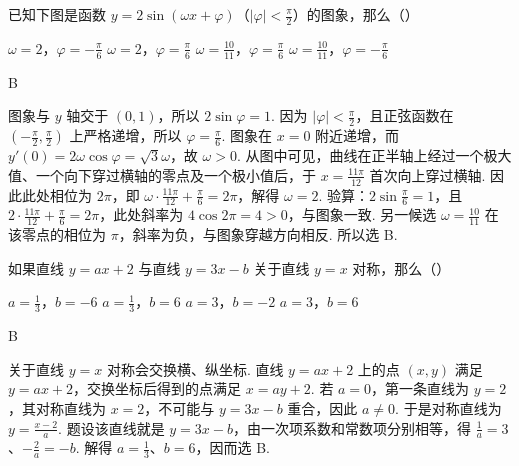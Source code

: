 \begin{problem}
已知下图是函数 \(y=2\sin\left( \omega x+\varphi \right)\)（\(\left| \varphi \right|<\frac{\pi}{2}\)）的图象，那么（\quad）


\choices
    {\(\omega=2\)，\(\varphi=-\frac{\pi}{6}\)}
    {\(\omega=2\)，\(\varphi=\frac{\pi}{6}\)}
    {\(\omega=\frac{10}{11}\)，\(\varphi=\frac{\pi}{6}\)}
    {\(\omega=\frac{10}{11}\)，\(\varphi=-\frac{\pi}{6}\)}
\end{problem}

\begin{answer}
B
\end{answer}

\begin{solution}
图象与 \(y\) 轴交于 \(\left(0,1\right)\)，所以 \(2\sin\varphi=1\). 因为 \(\left|\varphi\right|<\frac{\pi}{2}\)，且正弦函数在 \(\left(-\frac{\pi}{2},\frac{\pi}{2}\right)\) 上严格递增，所以 \(\varphi=\frac{\pi}{6}\). 图象在 \(x=0\) 附近递增，而 \(y'(0)=2\omega\cos\varphi=\sqrt{3}\omega\)，故 \(\omega>0\). 从图中可见，曲线在正半轴上经过一个极大值、一个向下穿过横轴的零点及一个极小值后，于 \(x=\frac{11\pi}{12}\) 首次向上穿过横轴. 因此此处相位为 \(2\pi\)，即 \(\omega\cdot\frac{11\pi}{12}+\frac{\pi}{6}=2\pi\)，解得 \(\omega=2\). 验算：\(2\sin\frac{\pi}{6}=1\)，且 \(2\cdot\frac{11\pi}{12}+\frac{\pi}{6}=2\pi\)，此处斜率为 \(4\cos2\pi=4>0\)，与图象一致. 另一候选 \(\omega=\frac{10}{11}\) 在该零点的相位为 \(\pi\)，斜率为负，与图象穿越方向相反. 所以选 B.
\end{solution}

\begin{problem}
如果直线 \(y=ax+2\) 与直线 \(y=3x-b\) 关于直线 \(y=x\) 对称，那么（\quad）

\choices
    {\(a=\frac{1}{3}\)，\(b=-6\)}
    {\(a=\frac{1}{3}\)，\(b=6\)}
    {\(a=3\)，\(b=-2\)}
    {\(a=3\)，\(b=6\)}
\end{problem}

\begin{answer}
B
\end{answer}

\begin{solution}
关于直线 \(y=x\) 对称会交换横、纵坐标. 直线 \(y=ax+2\) 上的点 \((x,y)\) 满足 \(y=ax+2\)，交换坐标后得到的点满足
\(x=ay+2\).
若 \(a=0\)，第一条直线为 \(y=2\)，其对称直线为 \(x=2\)，不可能与 \(y=3x-b\) 重合，因此 \(a\ne0\). 于是对称直线为 \(y=\frac{x-2}{a}\). 题设该直线就是 \(y=3x-b\)，由一次项系数和常数项分别相等，得 \(\frac{1}{a}=3\)、\(-\frac{2}{a}=-b\).
解得 \(a=\frac{1}{3}\)、\(b=6\)，因而选 B.
\end{solution}

